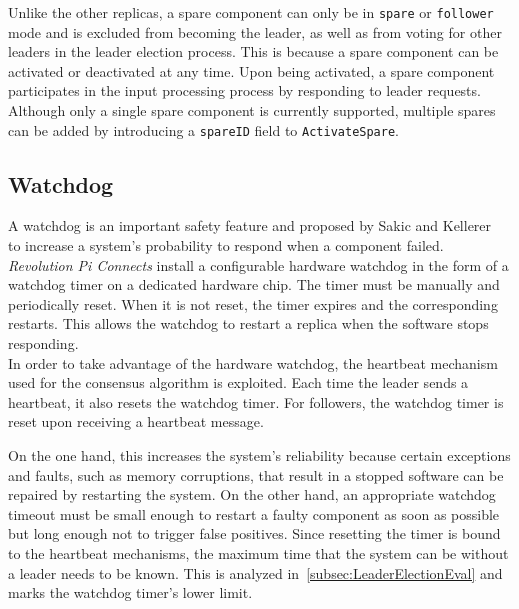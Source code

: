 Unlike the other replicas, a spare component can only be in \texttt{spare} or \texttt{follower} mode and is excluded from becoming the leader, as well as from voting for other leaders in the leader election process.
This is because a spare component can be activated or deactivated at any time.
Upon being activated, a spare component participates in the input processing process by responding to leader requests.
\\

Although only a single spare component is currently supported, multiple spares can be added by introducing a \texttt{spareID} field to \texttt{ActivateSpare}.

\subsection{Watchdog}

A watchdog is an important safety feature and proposed by Sakic and Kellerer~\cite{SakicTimeInConsensus} to increase a system's probability to respond when a component failed.
\textit{Revolution Pi Connects} install a configurable hardware watchdog in the form of a watchdog timer on a dedicated hardware chip.
The timer must be manually and periodically reset.
When it is not reset, the timer expires and the corresponding  restarts.
This allows the watchdog to restart a replica when the  software stops responding.
\\

In order to take advantage of the hardware watchdog, the heartbeat mechanism used for the consensus algorithm is exploited.
Each time the leader sends a heartbeat, it also resets the watchdog timer.
For followers, the watchdog timer is reset upon receiving a heartbeat message.

On the one hand, this increases the system's reliability because certain exceptions and faults, such as memory corruptions, that result in a stopped software can be repaired by restarting the system.
On the other hand, an appropriate watchdog timeout must be small enough to restart a faulty component as soon as possible but long enough not to trigger false positives.
Since resetting the timer is bound to the heartbeat mechanisms, the maximum time that the system can be without a leader needs to be known.
This is analyzed in~\autoref{subsec:LeaderElectionEval} and marks the watchdog timer's lower limit.


\iffalse






